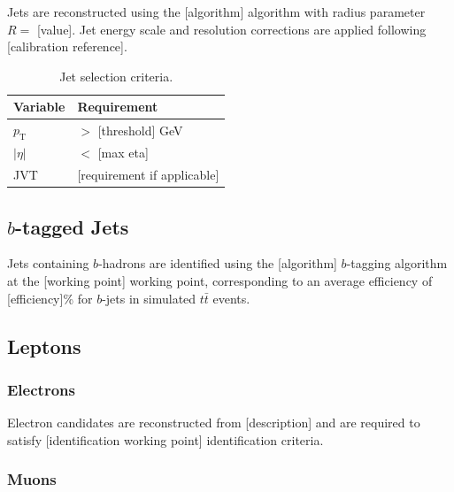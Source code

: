 Jets are reconstructed using the [algorithm] algorithm with radius parameter
$R = $ [value]. Jet energy scale and resolution corrections are applied
following [calibration reference].

\begin{table}[htbp]
  \centering
  \caption{Jet selection criteria.}
  \label{tab:jet_sel}
  \begin{tabular}{ll}
    \toprule
    Variable & Requirement \\
    \midrule
    $p_\text{T}$       & $>$ [threshold] GeV \\
    $|\eta|$            & $<$ [max eta] \\
    JVT                 & [requirement if applicable] \\
    \bottomrule
  \end{tabular}
\end{table}

\subsection{$b$-tagged Jets}
\label{sec:objects:btags}


Jets containing $b$-hadrons are identified using the [algorithm] $b$-tagging
algorithm at the [working point] working point, corresponding to an average
efficiency of [efficiency]\% for $b$-jets in simulated $t\bar{t}$ events.

\subsection{Leptons}
\label{sec:objects:leptons}


\subsubsection{Electrons}

Electron candidates are reconstructed from [description] and are required
to satisfy [identification working point] identification criteria.

\subsubsection{Muons}

